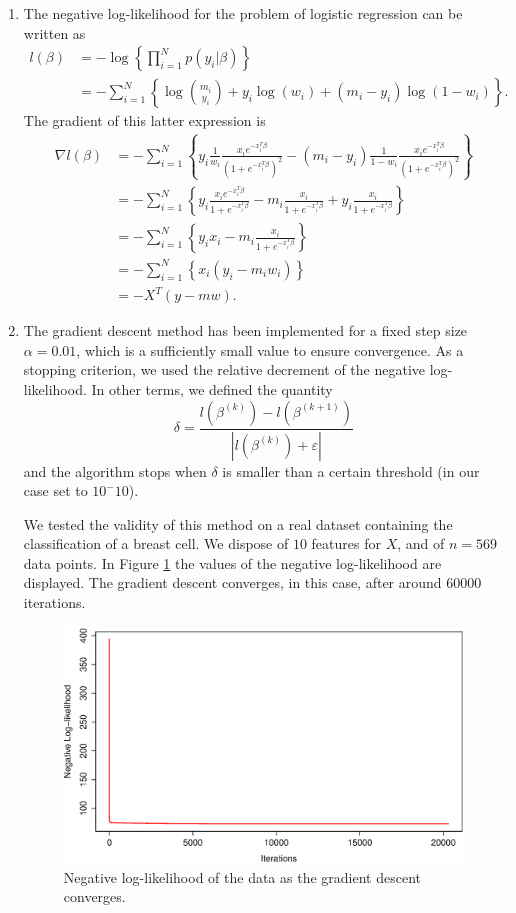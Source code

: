 \documentclass{homework}
\begin{document}
\begin{enumerate}[label=(\Alph*)]
\item The negative log-likelihood for the problem of logistic regression can be written as
\begin{align*}
l(\beta) &= - \log\left\lbrace \prod_{i=1}^N p(y_i | \beta) \right\rbrace
\\
&= -\sum_{i=1}^N \left\lbrace \log \binom{m_i}{y_i} + y_i \log(w_i) + (m_i - y_i) \log (1 - w_i) \right\rbrace.
\end{align*}
The gradient of this latter expression is 
\begin{align*}
\nabla l(\beta) &= - \sum_{i=1}^N \left\lbrace y_i \frac{1}{w_i} \frac{x_i e^{-x_i^T \beta}}{(1+e^{-x_i^T \beta})^2} - (m_i - y_i) \frac{1}{1-w_i} \frac{x_i e^{-x_i^T \beta}}{(1+e^{-x_i^T \beta})^2} \right\rbrace
\\
&= - \sum_{i=1}^N \left\lbrace y_i \frac{x_i e^{-x_i^T \beta}}{1+e^{-x_i^T \beta}} - m_i \frac{x_i}{1+e^{-x_i^T \beta}} + y_i \frac{x_i}{1+e^{-x_i^T \beta}} \right\rbrace
\\
&= - \sum_{i=1}^N \left\lbrace y_i x_i - m_i \frac{x_i}{1+e^{-x_i^T \beta}} \right\rbrace
\\
&= - \sum_{i=1}^N \left\lbrace x_i (y_i - m_i w_i) \right\rbrace
\\
&= -X^T (y - mw).
\end{align*}

\item The gradient descent method has been implemented for a fixed step size $\alpha = 0.01$, which is a sufficiently small value to ensure convergence. As a stopping criterion, we used the relative decrement of the negative log-likelihood. In other terms, we defined the quantity
$$\delta = \frac{l(\beta^{(k)}) - l(\beta^{(k+1)})}{| l(\beta^{(k)}) + \varepsilon|}$$
and the algorithm stops when $\delta$ is smaller than a certain threshold (in our case set to $10^-10$). 

We tested the validity of this method on a real dataset containing the classification of a breast cell. We dispose of $10$ features for $X$, and of $n = 569$ data points. In Figure \ref{fig:grad} the values of the negative log-likelihood are displayed. The gradient descent converges, in this case, after around $60000$ iterations.

\begin{figure}[!ht]
\centering
\includegraphics[width=0.6\columnwidth]{./Img/ll}
\caption{Negative log-likelihood of the data as the gradient descent converges.}
\label{fig:grad}
\end{figure}


\end{enumerate}
\end{document}
